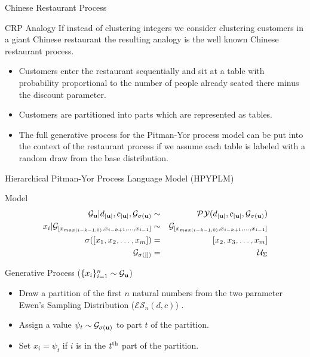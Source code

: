 \documentclass{beamer}
\newcommand{\G}{\mathcal{G}}
\newcommand{\PY}{\mathcal{P}\mathcal{Y}}
\newcommand{\ES}{\mathcal{E}\mathcal{S}}
\newcommand{\bu}{{\bf u}}
\begin{document}
\begin{frame}[t]{Chinese Restaurant Process}
	
	\begin{block}{CRP Analogy}
		If instead of clustering integers we consider clustering customers in a giant Chinese restaurant the resulting analogy is the well known Chinese restaurant process.  
		\begin{itemize}
			\item Customers enter the restaurant sequentially and sit at a table with probability proportional to the number of people already seated there minus the discount parameter.  
			\item Customers are partitioned into parts which are represented as tables.  
			\item The full generative process for the Pitman-Yor process model can be put into the context of the restaurant process if we assume each table is labeled with a random draw from the base distribution.
		\end{itemize}
	\end{block}
	
\end{frame}

\begin{frame}[t]{Hierarchical Pitman-Yor Process Language Model (HPYPLM)\cite{teh2006a}}

	\begin{block}{Model}
		\vspace{-.5cm}
		\begin{eqnarray*}
			\G_{{\bf u}} | d_{| \bu |}, c_{| \bu |}, \G_{\sigma(\bu)} &\sim& \PY(d_{| \bu |}, c_{| \bu |}, \G_{\sigma(\bu)}) \\
			x_i | \G_{[x_{max({i-k-1,0})}, x_{i-k+1}, \ldots, x_{i-1}]} &\sim& \G_{[x_{max({i-k-1,0})}, x_{i-k+1}, \ldots, x_{i-1}]}\\
			\sigma([x_1, x_2, \ldots, x_m]) &=& [x_2, x_3, \ldots, x_m]\\
			\G_{\sigma([])} &=& \mathcal{U}_\Sigma
		\end{eqnarray*}
	\end{block}
	
		\begin{block}{Generative Process ($\{x_i\}_{i = 1}^n \sim \G_\bu$)}
		\begin{itemize}
			\item Draw a partition of the first $n$ natural numbers from the two parameter Ewen's Sampling Distribution ($\ES_n(d,c)$) \cite{Ewens1995}.
			\item Assign a value $\psi_t \sim \G_{\sigma(\bu)}$ to part $t$ of the partition.
			\item Set $x_i = \psi_t$ if $i$ is in the $t^{\rm th}$ part of the partition.
		\end{itemize}
	\end{block}
\end{frame}
\end{document}
